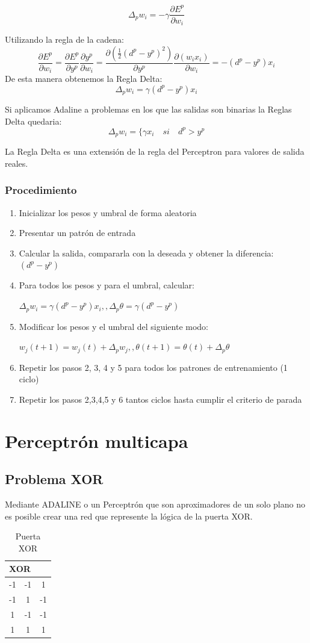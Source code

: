 \documentclass[12pt, twoside, openright]{report} %
\begin{document}
$$\Delta_pw_i=-\gamma\frac{\partial E^p}{\partial w_i}$$

Utilizando la regla de la cadena:
$$\frac{\partial E^p}{\partial w_i}=\frac{\partial E^p}{\partial y^p}\frac{\partial y^p}{\partial w_i}=\frac{\partial (\frac 1 2 (d^p-y^p)^2)}{\partial y^p}\frac{\partial(w_ix_i)}{\partial w_i}=-(d^p-y^p)x_i$$
De esta manera obtenemos la Regla Delta:
$$\Delta_pw_i=\gamma(d^p-y^p)x_i$$

Si aplicamos Adaline a problemas en los que las salidas son binarias la Reglas Delta quedaria:
$$\Delta_pw_i=\{ \gamma x_i \quad si \quad d^p > y^p$$

La Regla Delta es una extensión de la regla del Perceptron para valores de salida reales.

\subsection{Procedimiento}
\begin{enumerate}
	\item Inicializar los pesos y umbral de forma aleatoria
	\item Presentar un patrón de entrada
	\item Calcular la salida, compararla con la deseada y obtener la diferencia: $(d^p-y^p)$
	\item Para todos los pesos y para el umbral, calcular:
	      
	      $\Delta_pw_i=\gamma(d^p-y^p)x_i,, \Delta_p\theta=\gamma(d^p-y^p)$
	\item Modificar los pesos y el umbral del siguiente modo:
	      
	      $w_j(t+1)=w_j(t)+\Delta_pw_j,, \theta(t+1)=\theta(t)+\Delta_p\theta$
	\item Repetir los pasos 2, 3, 4 y 5 para todos los patrones de entrenamiento (1 ciclo)
	\item Repetir los pasos 2,3,4,5 y 6 tantos ciclos hasta cumplir el criterio de parada
\end{enumerate}

\chapter{Perceptrón multicapa}
\section{Problema XOR}
Mediante ADALINE o un Perceptrón que son aproximadores de un solo plano no es posible crear una red que represente la lógica de la puerta XOR.
\begin{table}[H]
	\centering
	\caption{Puerta XOR}
	\begin{tabular}{cc|c}
		\multicolumn{2}{l}{XOR} & \multicolumn{1}{l}{} \\ \hline
		-1 & -1 & 1  \\
		-1 & 1  & -1 \\
		1  & -1 & -1 \\
		1  & 1  & 1
	\end{tabular}
\end{table}
\end{document}
